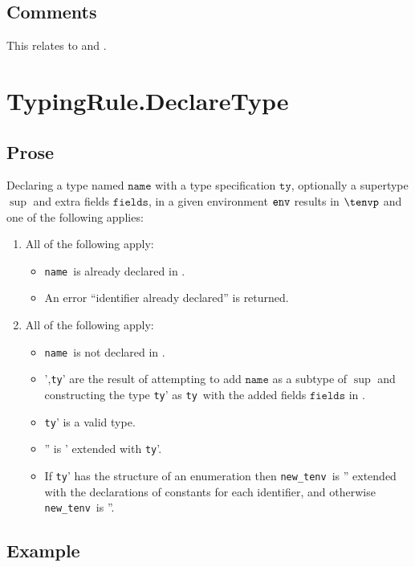 \documentclass{book}
\newcommand\newtenv[0]{\texttt{new\_tenv}}
\newcommand\tty[0]{\texttt{ty}}
\newcommand\fields[0]{\texttt{fields}}
\newcommand\name[0]{\texttt{name}}
\begin{document}
\subsection{Comments}
This relates to  and .

\section{TypingRule.DeclareType \label{sec:TypingRule.DeclareType}}
\subsection{Prose}
Declaring a type named $\name$ with a type specification $\tty$,
optionally a supertype $\sup$ and extra fields $\fields$, in a given environment $\texttt{env}$ results
in $\tenvp$ and one of the following applies:
\begin{enumerate}
  \item All of the following apply:
  \begin{itemize}
    \item \name\ is already declared in \tenv.
    \item An error ``identifier already declared'' is returned.
  \end{itemize}
  \item All of the following apply:
  \begin{itemize}
    \item \name\ is not declared in \tenv.
    \item  \tenv',\tty' are the result of attempting to add $\name$ as a subtype of $\sup$ and
    constructing the type \tty' as \tty\ with the added fields $\fields$ in \tenv.
    \item \tty' is a valid type.
    \item \tenv'' is \tenv' extended with \tty'.
    \item If \tty' has the structure of an enumeration then \newtenv\ is \tenv'' extended with the declarations of constants for each identifier,
    and otherwise \newtenv\ is \tenv''.
  \end{itemize}
\end{enumerate}

\subsection{Example}
\end{document}
